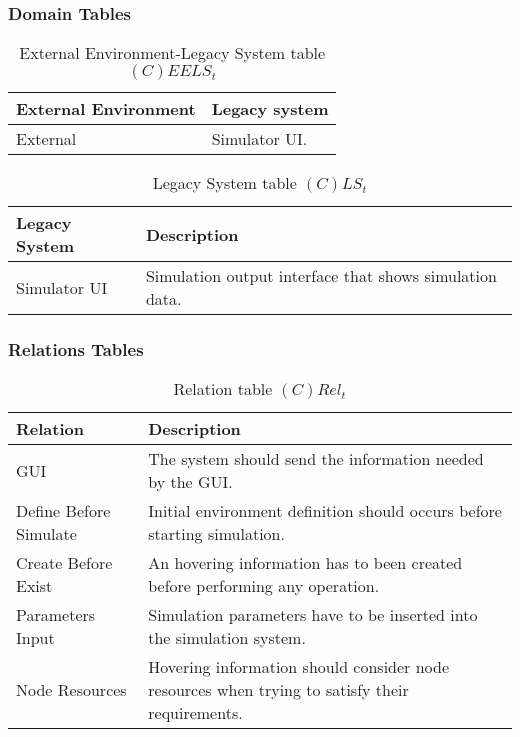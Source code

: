 \subsubsection{Domain Tables}

\begin{table}[H]
	\centering
	\begin{tabular}{|p{4cm}|p{8cm}|}
			\hline
			\textbf{External Environment} & \textbf{Legacy system} \\
			\hline
			External & Simulator UI. \\
			\hline
		\end{tabular}
	\caption{External Environment-Legacy System table $(C)EELS_t$}
	\label{tab:ceelst}
\end{table}

\begin{table}[H]
	\centering
	\begin{tabular}{|p{4cm}|p{8cm}|}
			\hline
			\textbf{Legacy System} & \textbf{Description} \\
			\hline
			Simulator UI & Simulation output interface that shows simulation data. \\
			\hline
		\end{tabular}
	\caption{Legacy System table $(C)LS_t$}
	\label{tab:clst}
\end{table}

\subsubsection{Relations Tables}

\begin{table}[H]
	\centering
	\begin{tabular}{|p{4cm}|p{8cm}|}
			\hline
			\textbf{Relation} & \textbf{Description} \\
			\hline
			GUI & The system should send the information needed by the GUI. \\
			\hline
			Define Before Simulate & Initial environment definition should occurs
			before starting simulation. \\
			\hline
			Create Before Exist & An hovering information has to been created before
			performing any operation. \\
			\hline
			Parameters Input & Simulation parameters have to be inserted into the
			simulation system. \\
			\hline
			Node Resources & Hovering information should consider node resources when
			trying to satisfy their requirements. \\
			\hline
		\end{tabular}
	\caption{Relation table $(C)Rel_t$}
	\label{tab:crelt}
\end{table}

